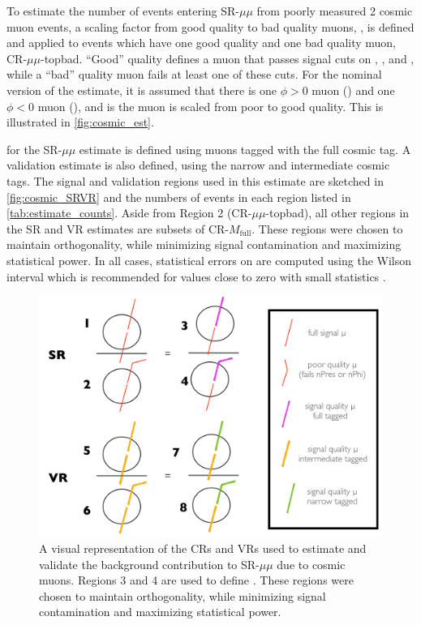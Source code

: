 To estimate the number of events entering SR-$\mu\mu$ from poorly measured 2 cosmic muon events, a scaling factor from good quality to bad quality muons, \rgood, is defined and applied to events which have one good quality and one bad quality muon, CR-$\mu\mu$-topbad. ``Good'' quality defines a muon that passes signal cuts on \nprecision, \nphi, and \chiCB, while a ``bad'' quality muon fails at least one of these cuts. For the nominal version of the estimate, it is assumed that there is one $\phi > 0$ muon (\mt) and one $\phi < 0$ muon (\mb), and \mt is the muon is scaled from poor to good quality. This is illustrated in \autoref{fig:cosmic_est}.

\rgood for the SR-$\mu\mu$ estimate is defined using muons tagged with the full cosmic tag. A validation estimate is also defined, using the narrow and intermediate cosmic tags. The signal and validation regions used in this estimate are sketched in \autoref{fig:cosmic_SRVR} and the numbers of events in each region listed in \autoref{tab:estimate_counts}. Aside from Region 2 (CR-$\mu\mu$-topbad), all other regions in the SR and VR estimates are subsets of CR-$M_{\textrm{full}}$. These regions were chosen to maintain orthogonality, while minimizing signal contamination and maximizing statistical power. In all cases, statistical errors on \rgood are computed using the Wilson interval which is recommended for values close to zero with small statistics \cite{ROOTAsymmErrors}. 

\begin{figure}[htbp]
\centering
\includegraphics[width=.8\textwidth]{figures/cosmics/SR-VR-sketch.png}
\caption{A visual representation of the CRs and VRs used to estimate and validate the background contribution to SR-$\mu\mu$ due to cosmic muons. Regions 3 and 4 are used to define \rgood. These regions were chosen to maintain orthogonality, while minimizing signal contamination and maximizing statistical power.}
\label{fig:cosmic_SRVR}
\end{figure}

